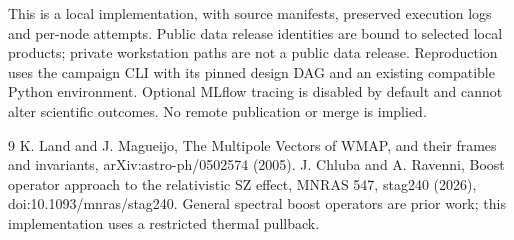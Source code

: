 \documentclass[11pt]{article}
\begin{document}
This is a local implementation, with source manifests, preserved execution logs and per-node attempts. Public data release identities are bound to selected local products; private workstation paths are not a public data release. Reproduction uses the campaign CLI with its pinned design DAG and an existing compatible Python environment. Optional MLflow tracing is disabled by default and cannot alter scientific outcomes. No remote publication or merge is implied.
\begin{thebibliography}{9}
 K. Land and J. Magueijo, The Multipole Vectors of WMAP, and their frames and invariants, arXiv:astro-ph/0502574 (2005).
 J. Chluba and A. Ravenni, Boost operator approach to the relativistic SZ effect, MNRAS 547, stag240 (2026), doi:10.1093/mnras/stag240. General spectral boost operators are prior work; this implementation uses a restricted thermal pullback.
\end{thebibliography}
\end{document}
